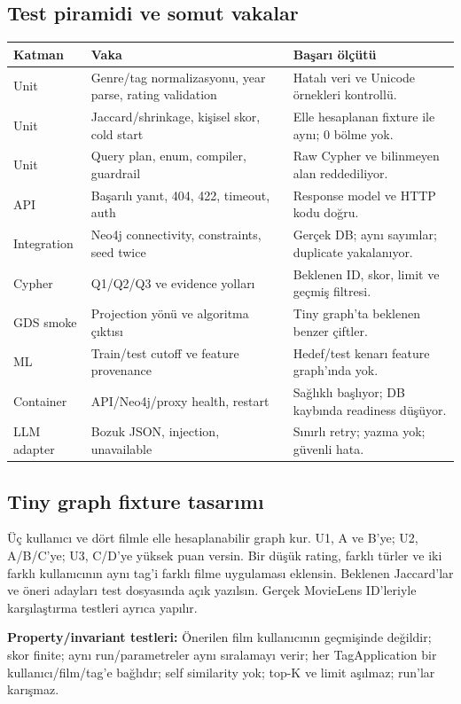 \documentclass[11pt,a4paper]{article}
\begin{document}
\subsection{Test piramidi ve somut vakalar}
\small
\begin{longtable}{@{}P{28mm}P{76mm}P{43mm}@{}}\toprule
\textbf{Katman} & \textbf{Vaka} & \textbf{Başarı ölçütü}\\\midrule\endhead
Unit & Genre/tag normalizasyonu, year parse, rating validation & Hatalı veri ve Unicode örnekleri kontrollü.\\
Unit & Jaccard/shrinkage, kişisel skor, cold start & Elle hesaplanan fixture ile aynı; 0 bölme yok.\\
Unit & Query plan, enum, compiler, guardrail & Raw Cypher ve bilinmeyen alan reddediliyor.\\
API & Başarılı yanıt, 404, 422, timeout, auth & Response model ve HTTP kodu doğru.\\
Integration & Neo4j connectivity, constraints, seed twice & Gerçek DB; aynı sayımlar; duplicate yakalanıyor.\\
Cypher & Q1/Q2/Q3 ve evidence yolları & Beklenen ID, skor, limit ve geçmiş filtresi.\\
GDS smoke & Projection yönü ve algoritma çıktısı & Tiny graph'ta beklenen benzer çiftler.\\
ML & Train/test cutoff ve feature provenance & Hedef/test kenarı feature graph'ında yok.\\
Container & API/Neo4j/proxy health, restart & Sağlıklı başlıyor; DB kaybında readiness düşüyor.\\
LLM adapter & Bozuk JSON, injection, unavailable & Sınırlı retry; yazma yok; güvenli hata.\\\bottomrule
\end{longtable}\normalsize

\subsection{Tiny graph fixture tasarımı}
Üç kullanıcı ve dört filmle elle hesaplanabilir graph kur. U1, A ve B'ye; U2, A/B/C'ye; U3, C/D'ye yüksek puan versin. Bir düşük rating, farklı türler ve iki farklı kullanıcının aynı tag'i farklı filme uygulaması eklensin. Beklenen Jaccard'lar ve öneri adayları test dosyasında açık yazılsın. Gerçek MovieLens ID'leriyle karşılaştırma testleri ayrıca yapılır.

\textbf{Property/invariant testleri:} Önerilen film kullanıcının geçmişinde değildir; skor finite; aynı run/parametreler aynı sıralamayı verir; her TagApplication bir kullanıcı/film/tag'e bağlıdır; self similarity yok; top-K ve limit aşılmaz; run'lar karışmaz.
\end{document}
